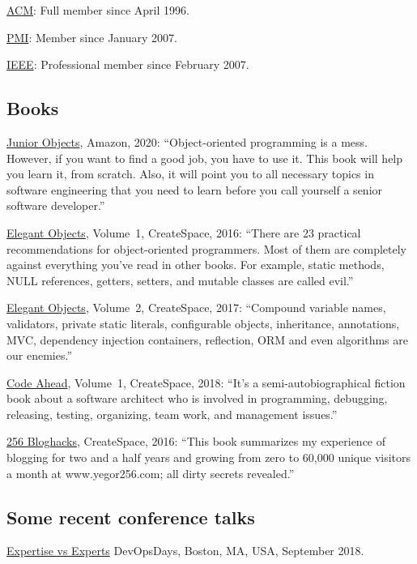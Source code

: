 \href{https://www.acm.org}{ACM}: Full member since April 1996.

\href{https://certification.pmi.org/registry.aspx}{PMI}: Member since January 2007.

\href{https://www.ieee.org}{IEEE}: Professional member since February 2007.

\subsection*{Books}

\href{https://amzn.to/2u9BbqF}{Junior Objects}, Amazon, 2020:
``Object-oriented programming is a mess. However,
if you want to find a good job, you have to use it.
This book will help you learn it, from scratch.
Also, it will point you to all necessary topics
in software engineering that you need to learn before
you call yourself a senior software developer.''

\href{https://amzn.to/2E5UHqZ}{Elegant Objects}, Volume~1, CreateSpace, 2016:
``There are 23 practical recommendations for object-oriented programmers. Most of them are completely
against everything you've read in other books.
For example, static methods, NULL references, getters, setters, and
mutable classes are called evil.''

\href{https://amzn.to/2J2s5T4}{Elegant Objects}, Volume~2, CreateSpace, 2017:
``Compound variable names, validators, private static literals, configurable objects, inheritance,
annotations, MVC, dependency injection containers, reflection, ORM and even algorithms are our enemies.''

\href{https://amzn.to/2u9BbqF}{Code Ahead}, Volume~1, CreateSpace, 2018:
``It's a semi-autobiographical fiction book about a software architect
who is involved in programming, debugging, releasing, testing,
organizing, team work, and management issues.''

\href{https://amzn.to/2GkuyXf}{256 Bloghacks}, CreateSpace, 2016:
``This book summarizes my experience of blogging for two and a half years and growing from zero to 60,000
unique visitors a month at www.yegor256.com; all dirty secrets revealed.''

\subsection*{Some recent conference talks}

\begin{samepage}
\href{https://youtu.be/KCx1o_lSMkI}{Expertise vs Experts}\newline
DevOpsDays, Boston, MA, USA, September 2018.
\end{samepage}

